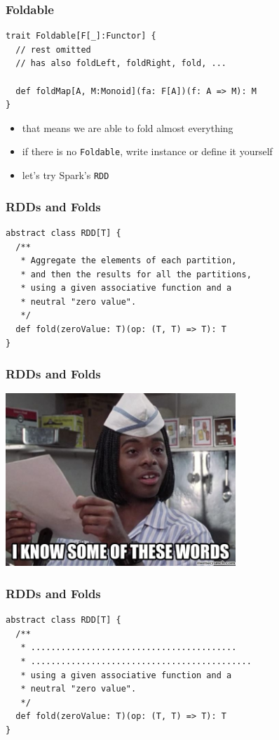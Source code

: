\documentclass[aspectratio=169]{beamer}
\begin{document}
\begin{frame}[fragile]
  \frametitle{Foldable}
  \begin{verbatim}
trait Foldable[F[_]:Functor] {
  // rest omitted
  // has also foldLeft, foldRight, fold, ...

  def foldMap[A, M:Monoid](fa: F[A])(f: A => M): M
}
  \end{verbatim}

  \begin{itemize}
  \item that means we are able to fold almost everything
  \item if there is no \texttt{Foldable}, write instance or define it yourself
  \item let's try Spark's \texttt{RDD}
  \end{itemize}
\end{frame}

\begin{frame}[fragile]
  \frametitle{RDDs and Folds}
\begin{verbatim}
abstract class RDD[T] {
  /**
   * Aggregate the elements of each partition,
   * and then the results for all the partitions,
   * using a given associative function and a
   * neutral "zero value".
   */
  def fold(zeroValue: T)(op: (T, T) => T): T
}
\end{verbatim}
\end{frame}

\begin{frame}[fragile]
  \frametitle{RDDs and Folds}
  \begin{center}
    \includegraphics[width=0.65\textwidth]{static-images/some-words.jpg}
  \end{center}
\end{frame}

\begin{frame}[fragile]
  \frametitle{RDDs and Folds}
\begin{verbatim}
abstract class RDD[T] {
  /**
   * .........................................
   * ............................................
   * using a given associative function and a
   * neutral "zero value".
   */
  def fold(zeroValue: T)(op: (T, T) => T): T
}
\end{verbatim}
\end{frame}
\end{document}
